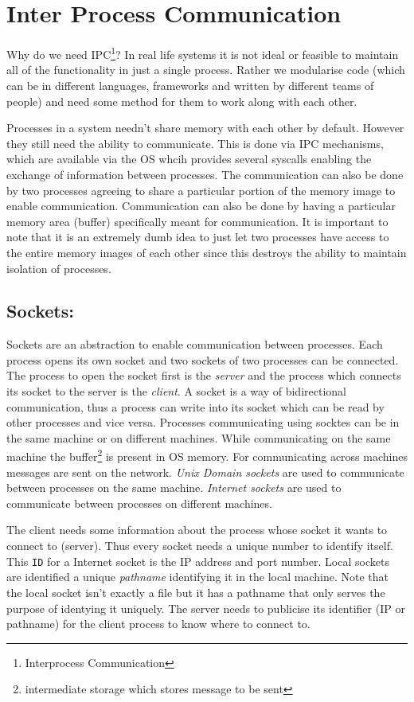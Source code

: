 \documentclass[12pt]{article}
\begin{document}
\section{Inter Process Communication}
Why do we need IPC\footnote{Interprocess Communication}? In real life systems it is not ideal or feasible to maintain all of the functionality in just a single
process. Rather we 
modularise code (which can be in different languages, frameworks and written by different teams of people) and need some method for them to work along with each other.

Processes in a system needn't share memory with each other by default. However they still need the ability to communicate. This is done via
IPC mechanisms, which are available via the OS whcih provides several syscalls enabling the exchange of information between processes. The communication can also
be done by two processes agreeing to share a particular portion of the memory image to enable communication. Communication can also be done by having a particular
memory area (buffer) specifically meant for communication. It is important to note that it is an extremely dumb idea to just let two processes have access to the entire 
memory images of each other since this destroys the ability to maintain isolation of processes.   


\subsection{Sockets:}
Sockets are an abstraction to enable communication between processes. Each process opens its own socket and two sockets of two processes can be connected.
The process to open the socket first is the \textit{server} and the process which connects its socket to the server is the \textit{client}. A socket is a way of 
bidirectional communication, thus a process can write into its socket which can be read by other processes and vice versa. Processes communicating using socktes can be 
in the same machine or on different machines. While communicating on the same machine the buffer\footnote{intermediate storage which stores message to be sent} is present in OS memory. For communicating across machines messages are sent on the network.
\textit{Unix Domain sockets} are used to communicate between processes on the same machine. \textit{Internet sockets} are used to communicate between
processes on different machines. 


The client needs some information about the process whose socket it wants to connect to (server). Thus every socket needs a unique number
to identify itself. This \texttt{ID} for a Internet socket is the IP address and port number. Local sockets are identified a unique \textit{pathname} identifying it in the local machine. Note that the local
socket isn't exactly a file but it has a pathname that only serves the purpose of identying it uniquely.
The server needs to publicise its identifier (IP or pathname) for the client process to know where to connect to.
\end{document}
